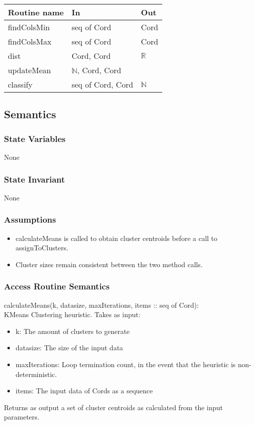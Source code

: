 \documentclass[12pt]{article}
\begin{document}
\begin{tabular}{| l | l | l |}
\hline
\textbf{Routine name} & \textbf{In} & \textbf{Out}\\
\hline
findColsMin & seq of Cord & Cord\\
\hline
findColsMax & seq of Cord & Cord\\
\hline
dist & Cord, Cord & $\mathbb{R}$ \\
\hline
updateMean & $\mathbb{N}$, Cord, Cord & ~ \\
\hline
classify & seq of Cord, Cord & $\mathbb{N}$ \\
\hline
\end{tabular}

\subsection* {Semantics}

\subsubsection* {State Variables}

None

\subsubsection* {State Invariant}

None

\subsubsection* {Assumptions}

\begin{itemize}
\item calculateMeans is called to obtain cluster centroids before a call
to assignToClusters.
\item Cluster sizes remain consistent between the two method calls.
\end{itemize}

\subsubsection* {Access Routine Semantics}

calculateMeans(k, datasize, maxIterations, items :: seq of Cord):\\
KMeans Clustering heuristic. Takes as input:
\begin{itemize}
\item k: The amount of clusters to generate
\item datasize: The size of the input data
\item maxIterations: Loop termination count, in the event that the
heuristic is non-deterministic.
\item items: The input data of Cords as a sequence
\end{itemize}
\noindent
Returns as output a set of cluster centroids as calculated from the 
input parameters.\\
\end{document}
